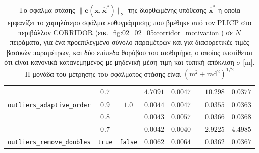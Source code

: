 \begin{table*}
\begin{tabular}{lccrrrrr}
                                      & $0.7$           &                 & $4.7091$        & $0.0047$        &  & $10.298$         & $0.0377$   \\
  \texttt{outliers\_adaptive\_order}  & $0.9$           & $1.0$           & $0.0044$        & $0.0047$        &  & $0.0355$         & $0.0363$   \\
                                      & $0.8$           &                 & $0.0043$        & $0.0057$        &  & $0.0366$         & $0.0368$   \\
                                      & $0.7$           &                 & $0.0042$        & $0.0040$        &  & $2.9225$         & $4.4985$   \\
  \texttt{outliers\_remove\_doubles}  & \texttt{true}   & \texttt{false}  & $0.0062$        & $0.0064$        &  & $0.0362$         & $0.0367$   \\ \bottomrule
\end{tabular}
  \caption{\small Το σφάλμα στάσης $\|\bm{e}(\bm{x},\hat{\bm{x}}^\ast)\|_2$ της
           διορθωμένης υπόθεσης $\hat{\bm{x}}^\ast$ η οποία εμφανίζει το
           χαμηλότερο σφάλμα ευθυγράμμισης που βρέθηκε από τον PLICP στο
           περιβάλλον CORRIDOR (εικ.  \ref{fig:02_02_05:corridor_motivation})
           σε $N$ πειράματα, για ένα προεπιλεγμένο σύνολο παραμέτρων και για
           διαφορετικές τιμές βασικών παραμέτρων, και δύο επίπεδα θορύβου του
           αισθητήρα, ο οποίος υποτίθεται ότι είναι κανονικά κατανεμημένος με
           μηδενική μέση τιμή και τυπική απόκλιση $\sigma$ [m]. Η μονάδα του
           μέτρησης του σφάλματος στάσης είναι $(\text{m}^2+\text{rad}^2)^{1/2}$}
\label{tbl:csm_diff_params}
\end{table*}


